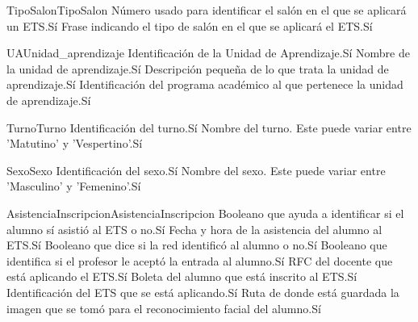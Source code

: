\begin{cdtEntidad}{TipoSalon}{TipoSalon}
	{Número usado para identificar el salón en el que se aplicará un ETS.}{Sí}
	{Frase indicando el tipo de salón en el que se aplicará el ETS.}{Sí}
\end{cdtEntidad}
\begin{cdtEntidad}{UA}{Unidad\_aprendizaje}
	{Identificación de la Unidad de Aprendizaje.}{Sí}
	{Nombre de la unidad de aprendizaje.}{Sí}
	{Descripción pequeña de lo que trata la unidad de aprendizaje.}{Sí}
	{Identificación del programa académico al que pertenece la unidad de aprendizaje.}{Sí}
\end{cdtEntidad}
\begin{cdtEntidad}{Turno}{Turno}
	{Identificación del turno.}{Sí}
	{Nombre del turno. Este puede variar entre 'Matutino' y 'Vespertino'.}{Sí}
\end{cdtEntidad}
\begin{cdtEntidad}{Sexo}{Sexo}
	{Identificación del sexo.}{Sí}
	{Nombre del sexo. Este puede variar entre 'Masculino' y 'Femenino'.}{Sí}
\end{cdtEntidad}
\begin{cdtEntidad}{AsistenciaInscripcion}{AsistenciaInscripcion}
	{Booleano que ayuda a identificar si el alumno sí asistió al ETS o no.}{Sí}
	{Fecha y hora de la asistencia del alumno al ETS.}{Sí}
	{Booleano que dice si la red identificó al alumno o no.}{Sí}
	{Booleano que identifica si el profesor le aceptó la entrada al alumno.}{Sí}
	{RFC del docente que está aplicando el ETS.}{Sí}
	{Boleta del alumno que está inscrito al ETS.}{Sí}
	{Identificación del ETS que se está aplicando.}{Sí}
	{Ruta de donde está guardada la imagen que se tomó para el reconocimiento facial del alumno.}{Sí}
\end{cdtEntidad}
